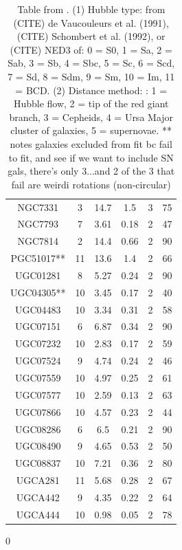 \documentclass[reprint,%
 amsmath,amssymb,
 aps,
]{revtex4-1}
\begin{document}
\begin{table}[]
\begin{tabular}{|c|c|c|c|c|c|}
NGC7331& 	3& 	14.7& 	1.5&    	3& 	75\\
NGC7793& 	7& 	3.61& 	0.18&   	2& 	47\\
NGC7814& 	2&  	14.4& 	0.66& 	2& 	90\\
PGC51017**& 	11& 	13.6& 	1.4& 	2& 	66\\
UGC01281& 	8&   	5.27& 	0.24& 	2& 	90\\
UGC04305**& 	10& 	3.45& 	0.17& 	2& 	40\\
UGC04483& 	10& 	3.34& 	0.31& 	2& 	58\\
UGC07151& 	6& 	6.87& 	0.34&   	2& 	90\\
UGC07232& 	10& 	2.83& 	0.17& 	2& 	59\\
UGC07524& 	9& 	4.74& 	0.24& 	    2& 	46\\
UGC07559& 	10& 	4.97& 	0.25& 	2& 	61\\
UGC07577& 	10& 	2.59& 	0.13& 	2& 	63\\
UGC07866& 	10& 	4.57& 	0.23& 	2& 	44\\
UGC08286& 	6& 	6.5& 	0.21&   	2& 	90\\
UGC08490& 	9& 	4.65& 	0.53&   	2& 	50\\
UGC08837& 	10& 	7.21& 	0.36& 	2& 	80\\
UGCA281& 	11& 	5.68& 	0.28& 	2& 	67\\
UGCA442& 	9& 	4.35& 	0.22& 	    2& 	64\\
UGCA444& 	10& 	0.98& 	0.05& 	2& 	78\\
    \hline \hline           
      \end{tabular}
      \caption{Table from  \citet{2016Lelli}. 
      (1) Hubble type:  from (CITE) de
Vaucouleurs et al. (1991), (CITE) Schombert et al. (1992), or (CITE) NED3
of: 0 = S0, 1 = Sa, 2 = Sab,
3 = Sb, 4 = Sbc, 5 = Sc, 6 = Scd, 7 = Sd, 8 = Sdm,
9 = Sm, 10 = Im, 11 = BCD.  (2) Distance method: : 1 = Hubble flow,
2 = tip of the red giant branch, 3 = Cepheids, 4 = Ursa Major
cluster of galaxies, 5 = supernovae. ** notes galaxies excluded from fit bc fail to fit, and see if we want to include SN gals, there's only 3...and 2 of the 3 that fail are weirdi rotations (non-circular)}
0      \label{tab:Tset}
  \end{table}
  
\end{document}

